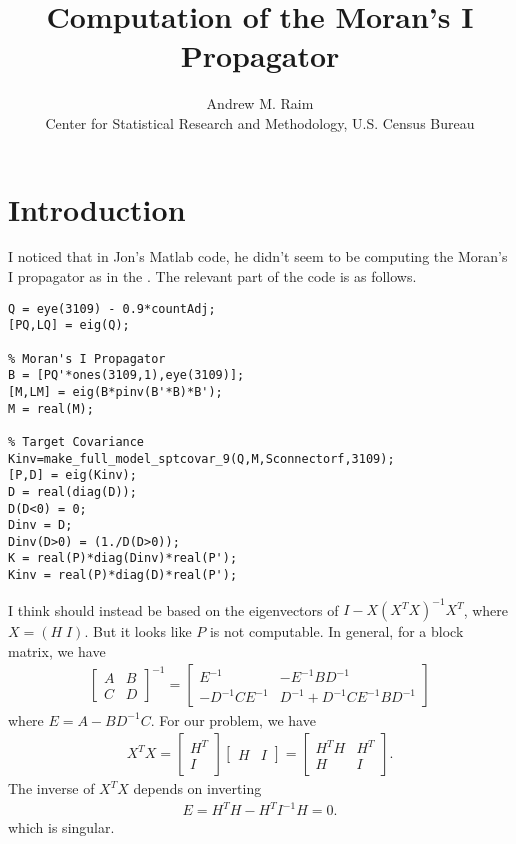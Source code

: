 \documentclass[10pt]{article}
\title{Computation of the Moran's I Propagator}
\author{Andrew M. Raim
\vspace{0.5em} \\
Center for Statistical Research and Methodology, U.S. Census Bureau
}
\begin{document}
\maketitle

\section{Introduction}
\label{sec:intro}
I noticed that in Jon's Matlab code, he didn't seem to be computing the Moran's I propagator as in the \citet{BradleyEtAl2016-STAT}. The relevant part of the code is as follows.

\begin{lstlisting}
Q = eye(3109) - 0.9*countAdj;
[PQ,LQ] = eig(Q);

% Moran's I Propagator
B = [PQ'*ones(3109,1),eye(3109)];
[M,LM] = eig(B*pinv(B'*B)*B');
M = real(M);

% Target Covariance
Kinv=make_full_model_sptcovar_9(Q,M,Sconnectorf,3109);
[P,D] = eig(Kinv);
D = real(diag(D));
D(D<0) = 0;
Dinv = D;
Dinv(D>0) = (1./D(D>0));
K = real(P)*diag(Dinv)*real(P');
Kinv = real(P)*diag(D)*real(P');
\end{lstlisting}
%
I think  should instead be based on the eigenvectors of $I - X(X^T X)^{-1} X^T$, where $X = (H \; I)$. But it looks like $P$ is not computable. In general, for a block matrix, we have
%
\begin{align*}
\begin{bmatrix}
A & B \\
C & D
\end{bmatrix}^{-1}
=
\begin{bmatrix}
E^{-1} & -E^{-1} B D^{-1} \\
-D^{-1} C E^{-1} & D^{-1} + D^{-1} C E^{-1} B D^{-1}
\end{bmatrix}
\end{align*}
%
where $E = A - B D^{-1} C$. For our problem, we have
%
\begin{align*}
X^T X =
\begin{bmatrix}
H^T \\
I
\end{bmatrix}
\begin{bmatrix}
H & I
\end{bmatrix}
=
\begin{bmatrix}
H^T H & H^T \\
H & I
\end{bmatrix}.
\end{align*}
%
The inverse of $X^T X$ depends on inverting
%
\begin{align*}
E = H^T H - H^T I^{-1} H = 0.
\end{align*}
%
which is singular.



%
\end{document}
